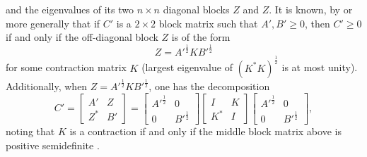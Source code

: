 \documentclass[notitlepage, 10pt]{article}
\begin{document}
and the eigenvalues of its two $n\times n$ diagonal blocks $Z$ and $Z$.
It is known, by \cite[Theorem 7.7.9]{horn2012matrix} or more generally \cite[Theorem 5.11]{moslehian2019positivity} that if $C'$ is a $2\times 2$ block matrix such that $A',B' \geq 0$, then $C' \geq 0$ if and only if the off-diagonal block $Z$ is of the form
\begin{equation}
    Z = A'^{\frac{1}{2}} K B'^{\frac{1}{2}}
\end{equation}
for some contraction matrix $K$ (largest eigenvalue of $(K^{*}K)^{\frac{1}{2}}$ is at most unity).
Additionally, when $Z = A'^{\frac{1}{2}} K B'^{\frac{1}{2}}$, one has the decomposition
\begin{equation}
    C' = \begin{bmatrix}
        A' & Z \\
        Z^{*} & B'
    \end{bmatrix}
    =
    \begin{bmatrix}
        A'^{\frac{1}{2}} & 0 \\
        0 & B'^{\frac{1}{2}}
    \end{bmatrix}
    \begin{bmatrix}
        I & K \\
        K^{*} & I
    \end{bmatrix}
    \begin{bmatrix}
        A'^{\frac{1}{2}} & 0 \\
        0 & B'^{\frac{1}{2}}
    \end{bmatrix},
\end{equation}
noting that $K$ is a contraction if and only if the middle block matrix above is positive semidefinite \cite[Lemma 5.10]{moslehian2019positivity}.
\end{document}
